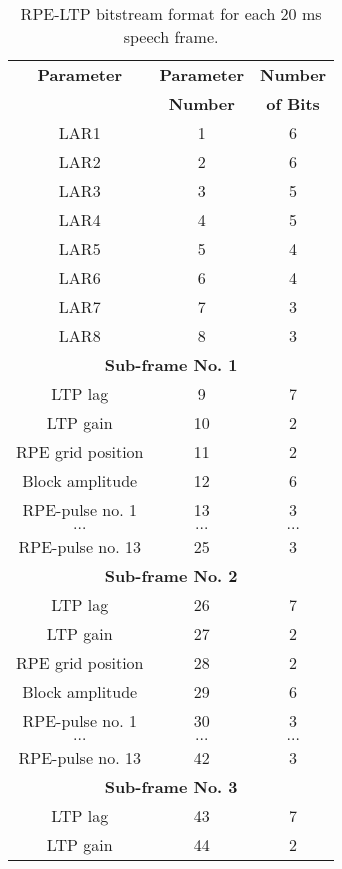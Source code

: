 \begin{table}
\centering\small
\caption{RPE-LTP bitstream format for each 20 ms speech frame.}
\begin{tabular}{|c|c|c|} \hline
\bf Parameter     & \bf Parameter & \bf Number \\
                  & \bf Number    & \bf of Bits\\
\hline
LAR1              &1    & 6 \\
LAR2              &2    & 6 \\
LAR3              &3    & 5 \\
LAR4              &4    & 5 \\
LAR5              &5    & 4 \\
LAR6              &6    & 4 \\
LAR7              &7    & 3 \\
LAR8              &8    & 3 \\
\hline
\multicolumn{3}{|c|}{\bf Sub-frame No. 1} \\
\hline
LTP lag           &9    & 7 \\
LTP gain          &10   & 2 \\
RPE grid position &11   & 2 \\
Block amplitude   &12   & 6 \\
RPE-pulse no. 1   &13   & 3 \\
$\ldots$          &$\ldots$ &$\ldots$\\
RPE-pulse no. 13  &25   & 3 \\
\hline
\multicolumn{3}{|c|}{\bf Sub-frame No. 2} \\
\hline
LTP lag           &26   & 7 \\
LTP gain          &27   & 2 \\
RPE grid position &28   & 2 \\
Block amplitude   &29   & 6 \\
RPE-pulse no. 1   &30   & 3 \\
$\ldots$          &$\ldots$ &$\ldots$\\
RPE-pulse no. 13  &42   & 3 \\
\hline
\multicolumn{3}{|c|}{\bf Sub-frame No. 3} \\
\hline
LTP lag           &43   & 7 \\
LTP gain          &44   & 2 \\

\end{tabular}
\end{table}
